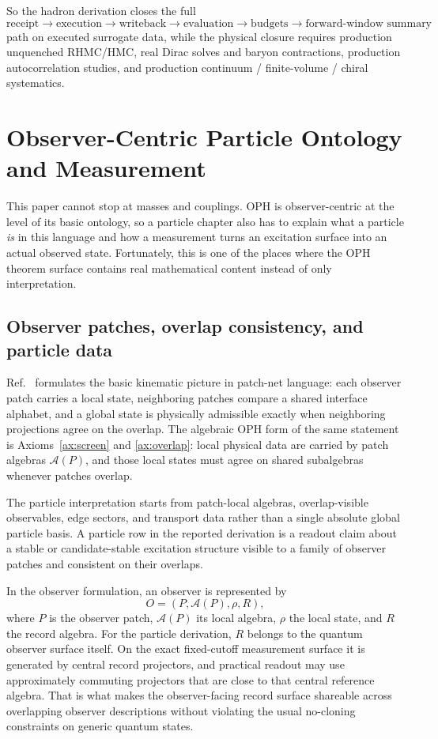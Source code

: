 \documentclass[11pt]{article}
\begin{document}
So the hadron derivation closes the full
\[
\text{receipt} \to \text{execution} \to \text{writeback} \to \text{evaluation} \to \text{budgets} \to \text{forward-window summary}
\]
path on executed surrogate data, while the physical closure requires production
unquenched RHMC/HMC, real Dirac solves and baryon contractions, production autocorrelation
studies, and production continuum / finite-volume / chiral systematics.

\section{Observer-Centric Particle Ontology and Measurement}

This paper cannot stop at masses and couplings. OPH is observer-centric at the level of
its basic ontology, so a particle chapter also has to explain what a particle \emph{is} in this
language and how a measurement turns an excitation surface into an actual observed state.
Fortunately, this is one of the places where the OPH theorem surface contains
real mathematical content instead of only interpretation.

\subsection{Observer patches, overlap consistency, and particle data}

Ref.~\cite{ophconsensus} formulates the basic kinematic picture in patch-net language: each observer
patch carries a local state, neighboring patches compare a shared interface alphabet, and a
global state is physically admissible exactly when neighboring projections agree on the overlap.
The algebraic OPH form of the same statement is Axioms~\ref{ax:screen} and
\ref{ax:overlap}: local physical data are carried by patch algebras \(\mathcal A(P)\), and those local
states must agree on shared subalgebras whenever patches overlap.

The particle interpretation starts from patch-local algebras, overlap-visible observables, edge
sectors, and transport data rather than a single absolute global particle basis. A particle row in
the reported derivation is a readout claim about a stable or candidate-stable excitation structure
visible to a family of observer patches and consistent on their overlaps.

In the observer formulation, an observer is represented by
\[
O=(P,\mathcal A(P),\rho,R),
\]
where \(P\) is the observer patch, \(\mathcal A(P)\) its local algebra, \(\rho\) the local
state, and \(R\) the record algebra. For the particle derivation, \(R\) belongs to the quantum
observer surface itself. On the exact fixed-cutoff measurement
surface it is generated by central record projectors, and practical readout may use
approximately commuting projectors that are close to that central reference algebra. That is what
makes the observer-facing record surface shareable across overlapping observer descriptions
without violating the usual no-cloning constraints on generic quantum states.
\end{document}
